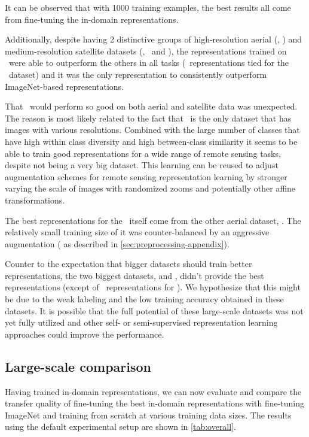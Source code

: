  
It can be observed that with 1000 training examples, the best results all come from fine-tuning the in-domain representations. 

Additionally, despite having 2 distinctive groups of high-resolution aerial (\res{}, \ucm{}) and medium-resolution satellite datasets (\ben, \eur\ and \sos), the representations trained on \res\ were able to outperform the others in all tasks (\ben\ representations tied for the \ucm\ dataset) and it was the only representation to consistently outperform ImageNet-based representations.

That \res\ would perform so good on both aerial and satellite data was unexpected. The reason is most likely related to the fact that \res\ is the only dataset that has images with various resolutions. 
Combined with the large number of classes that have high within class diversity and high between-class similarity it seems to be able to train good representations for a wide range of remote sensing tasks, despite not being a very big dataset. This learning can be reused to adjust augmentation schemes for remote sensing representation learning by stronger varying the scale of images with randomized zooms and potentially other affine transformations.



The best representations for the \res\ itself come from the other aerial dataset, \ucm{}. The relatively small training size of it was counter-balanced by an aggressive augmentation (\rcropPP{} as described in \cref{sec:preprocessing-appendix}). 

Counter to the expectation that bigger datasets should train better representations, the two biggest datasets, \ben{} and \sos{}, didn't provide the best representations (except of \ben\ representations for \ucm). We hypothesize that this might be due to the weak labeling and the low training accuracy obtained in these datasets. It is possible that the full potential of these large-scale datasets was not yet fully utilized and other self- or semi-supervised representation learning approaches could improve the performance.



\subsection{Large-scale comparison}
Having trained in-domain representations, we can now evaluate and compare the transfer quality of fine-tuning the best in-domain representations with fine-tuning ImageNet and training from scratch at various training data sizes. The results using the default experimental setup are shown in \cref{tab:overall}.

